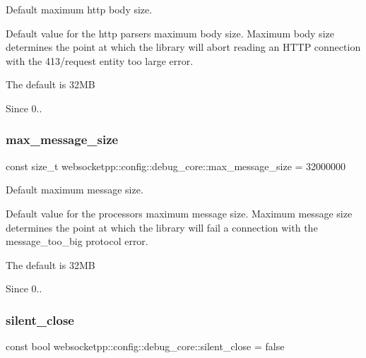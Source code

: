 Default maximum http body size. 

Default value for the http parser\textquotesingle{}s maximum body size. Maximum body size determines the point at which the library will abort reading an H\+T\+TP connection with the 413/request entity too large error.

The default is 32\+MB

\begin{DoxySince}{Since}
0.. 
\end{DoxySince}
\mbox{\label{structwebsocketpp_1_1config_1_1debug__core_a2c46fa8d65f3a6a69ccec42bd0e91e20}} 
\subsubsection{\texorpdfstring{max\+\_\+message\+\_\+size}{max\_message\_size}}
{\footnotesize\ttfamily const size\+\_\+t websocketpp\+::config\+::debug\+\_\+core\+::max\+\_\+message\+\_\+size = 32000000\hspace{0.3cm}{\ttfamily [static]}}



Default maximum message size. 

Default value for the processor\textquotesingle{}s maximum message size. Maximum message size determines the point at which the library will fail a connection with the message\+\_\+too\+\_\+big protocol error.

The default is 32\+MB

\begin{DoxySince}{Since}
0.. 
\end{DoxySince}
\mbox{\label{structwebsocketpp_1_1config_1_1debug__core_a961630bca024033059ef50863d1fc174}} 
\subsubsection{\texorpdfstring{silent\+\_\+close}{silent\_close}}
{\footnotesize\ttfamily const bool websocketpp\+::config\+::debug\+\_\+core\+::silent\+\_\+close = false\hspace{0.3cm}{\ttfamily [static]}}



